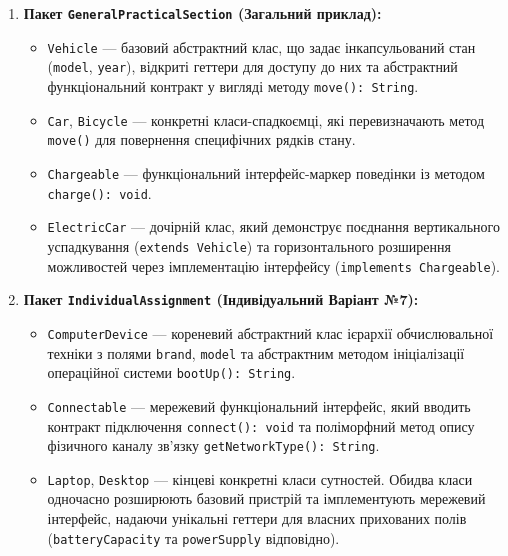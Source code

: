 \begin{enumerate}
    \item \textbf{Пакет \texttt{GeneralPracticalSection} (Загальний приклад):}
    \begin{itemize}
        \item \texttt{Vehicle} — базовий абстрактний клас, що задає інкапсульований 
        стан (\texttt{model}, \texttt{year}), відкриті геттери для доступу до них та
         абстрактний функціональний контракт у вигляді методу \texttt{move(): String}.
        \item \texttt{Car}, \texttt{Bicycle} — конкретні класи-спадкоємці, які 
        перевизначають метод \texttt{move()} для повернення специфічних рядків стану.
        \item \texttt{Chargeable} — функціональний інтерфейс-маркер поведінки із 
        методом \texttt{charge(): void}.
        \item \texttt{ElectricCar} — дочірній клас, який демонструє поєднання 
        вертикального успадкування (\texttt{extends Vehicle}) та горизонтального 
        розширення можливостей через імплементацію інтерфейсу (\texttt{implements Chargeable}).
    \end{itemize}
    
    \item \textbf{Пакет \texttt{IndividualAssignment} (Індивідуальний Варіант №7):}
    \begin{itemize}
        \item \texttt{ComputerDevice} — кореневий абстрактний клас ієрархії 
        обчислювальної техніки з полями \texttt{brand}, \texttt{model} та абстрактним 
        методом ініціалізації операційної системи \texttt{bootUp(): String}.
        \item \texttt{Connectable} — мережевий функціональний інтерфейс, який вводить 
        контракт підключення \texttt{connect(): void} та поліморфний метод опису 
        фізичного каналу зв'язку \texttt{getNetworkType(): String}.
        \item \texttt{Laptop}, \texttt{Desktop} — кінцеві конкретні класи сутностей. 
        Обидва класи одночасно розширюють базовий пристрій та імплементують мережевий 
        інтерфейс, надаючи унікальні геттери для власних прихованих полів (\texttt{batteryCapacity}
         та \texttt{powerSupply} відповідно).
    \end{itemize}
\end{enumerate}

